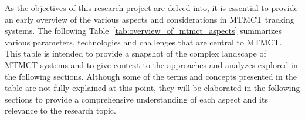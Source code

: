 As the objectives of this research project are delved into, it is essential to provide an early overview of the various aspects and considerations in MTMCT tracking systems. The following Table~\ref{tab:overview_of_mtmct_aspects} summarizes various parameters, technologies and challenges that are central to MTMCT. This table is intended to provide a snapshot of the complex landscape of MTMCT systems and to give context to the approaches and analyzes explored in the following sections. Although some of the terms and concepts presented in the table are not fully explained at this point, they will be elaborated in the following sections to provide a comprehensive understanding of each aspect and its relevance to the research topic.

\begin{table}[ht]
	\centering
	\caption{Overview of MTMCT Aspects}\label{tab:overview_of_mtmct_aspects}
\end{table}
